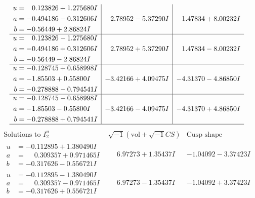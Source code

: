 \documentclass[1p]{elsarticle_modified}
\theoremstyle{definition}
\newcommand{\I}{\sqrt{-1}}
\begin{document}
$$\begin{array}{c|c|c}
\begin{aligned}
u &= \phantom{-}0.123826 + 1.275680 I \\
a &= -0.494186 - 0.312606 I \\
b &= -0.56449 + 2.86824 I\end{aligned}
 & \phantom{-}2.78952 - 5.37290 I & \phantom{-}1.47834 + 8.00232 I \\ \hline\begin{aligned}
u &= \phantom{-}0.123826 - 1.275680 I \\
a &= -0.494186 + 0.312606 I \\
b &= -0.56449 - 2.86824 I\end{aligned}
 & \phantom{-}2.78952 + 5.37290 I & \phantom{-}1.47834 - 8.00232 I \\ \hline\begin{aligned}
u &= -0.128745 + 0.658998 I \\
a &= -1.85503 + 0.55800 I \\
b &= -0.278888 - 0.794541 I\end{aligned}
 & -3.42166 + 4.09475 I & -4.31370 - 4.86850 I \\ \hline\begin{aligned}
u &= -0.128745 - 0.658998 I \\
a &= -1.85503 - 0.55800 I \\
b &= -0.278888 + 0.794541 I\end{aligned}
 & -3.42166 - 4.09475 I & -4.31370 + 4.86850 I\\
 \hline 
 \end{array}$$\newpage$$\begin{array}{c|c|c}  
\text{Solutions to }I^u_{2}& \I (\text{vol} + \sqrt{-1}CS) & \text{Cusp shape}\\
 \hline 
\begin{aligned}
u &= -0.112895 + 1.380490 I \\
a &= \phantom{-}0.309357 + 0.971465 I \\
b &= -0.317626 - 0.556721 I\end{aligned}
 & \phantom{-}6.97273 + 1.35437 I & -1.04092 - 3.37423 I \\ \hline\begin{aligned}
u &= -0.112895 - 1.380490 I \\
a &= \phantom{-}0.309357 - 0.971465 I \\
b &= -0.317626 + 0.556721 I\end{aligned}
 & \phantom{-}6.97273 - 1.35437 I & -1.04092 + 3.37423 I \\ \hline\begin{aligned}

\end{aligned}
\end{array}$$
\end{document}
